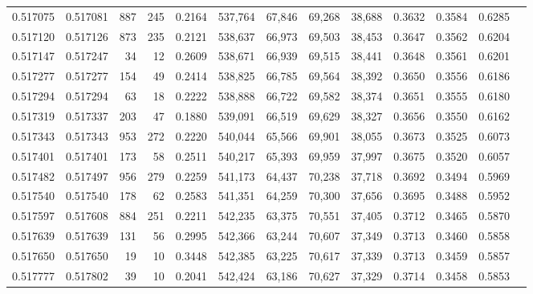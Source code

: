 \begin{tabular}{rrrrrrrrrrrrr}
0.517075 & 0.517081 &   887 &   245 &                                     0.2164 & 537,764 &  67,846 &  69,268 &  38,688 & 0.3632 & 0.3584 & 0.6285 \\
0.517120 & 0.517126 &   873 &   235 &                                     0.2121 & 538,637 &  66,973 &  69,503 &  38,453 & 0.3647 & 0.3562 & 0.6204 \\
0.517147 & 0.517247 &    34 &    12 &                                     0.2609 & 538,671 &  66,939 &  69,515 &  38,441 & 0.3648 & 0.3561 & 0.6201 \\
0.517277 & 0.517277 &   154 &    49 &                                     0.2414 & 538,825 &  66,785 &  69,564 &  38,392 & 0.3650 & 0.3556 & 0.6186 \\
0.517294 & 0.517294 &    63 &    18 &                                     0.2222 & 538,888 &  66,722 &  69,582 &  38,374 & 0.3651 & 0.3555 & 0.6180 \\
0.517319 & 0.517337 &   203 &    47 &                                     0.1880 & 539,091 &  66,519 &  69,629 &  38,327 & 0.3656 & 0.3550 & 0.6162 \\
0.517343 & 0.517343 &   953 &   272 &                                     0.2220 & 540,044 &  65,566 &  69,901 &  38,055 & 0.3673 & 0.3525 & 0.6073 \\
0.517401 & 0.517401 &   173 &    58 &                                     0.2511 & 540,217 &  65,393 &  69,959 &  37,997 & 0.3675 & 0.3520 & 0.6057 \\
0.517482 & 0.517497 &   956 &   279 &                                     0.2259 & 541,173 &  64,437 &  70,238 &  37,718 & 0.3692 & 0.3494 & 0.5969 \\
0.517540 & 0.517540 &   178 &    62 &                                     0.2583 & 541,351 &  64,259 &  70,300 &  37,656 & 0.3695 & 0.3488 & 0.5952 \\
0.517597 & 0.517608 &   884 &   251 &                                     0.2211 & 542,235 &  63,375 &  70,551 &  37,405 & 0.3712 & 0.3465 & 0.5870 \\
0.517639 & 0.517639 &   131 &    56 &                                     0.2995 & 542,366 &  63,244 &  70,607 &  37,349 & 0.3713 & 0.3460 & 0.5858 \\
0.517650 & 0.517650 &    19 &    10 &                                     0.3448 & 542,385 &  63,225 &  70,617 &  37,339 & 0.3713 & 0.3459 & 0.5857 \\
0.517777 & 0.517802 &    39 &    10 &                                     0.2041 & 542,424 &  63,186 &  70,627 &  37,329 & 0.3714 & 0.3458 & 0.5853 \\

\end{tabular}
